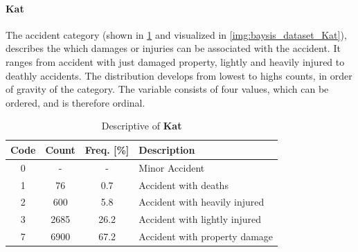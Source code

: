\paragraph{Kat}
\label{baysis_dataset_Kat}
The accident category (shown in \cref{tbl:baysis_dataset_Kat} and visualized in \cref{img:baysis_dataset_Kat}), describes the which damages or injuries can be associated with the accident. It ranges from accident with just  damaged property, lightly and heavily injured to deathly accidents. The distribution develops from lowest to highs counts, in order of gravity of the category. The variable consists of four values, which can be ordered, and is therefore ordinal.
\begin{table}[!ht]
	\centering
	\small
	\begin{tabular}{c|c|c|l} 
		\toprule
		Code & Count & Freq. [\%] & Description \\ 
		\midrule
 		0 	& - 	& 	-	& Minor Accident  \\
 		1 	& 76 	& 0.7 	& Accident with deaths  \\ 
 		2 	& 600	& 5.8	& Accident with heavily injured  \\
 		3 	& 2685	& 26.2	& Accident with lightly injured  \\
		7 	& 6900	& 67.2	& Accident with property damage  \\
		\bottomrule
	\end{tabular}
	\caption{Descriptive of \textbf{Kat}}
	\label{tbl:baysis_dataset_Kat}
\end{table}

